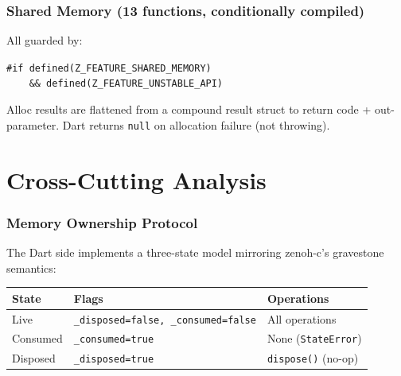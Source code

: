 \documentclass[11pt,a4paper]{article}
\newcommand{\code}[1]{\texttt{#1}}
\begin{document}
\section{Shared Memory (13 functions, conditionally compiled)}

All guarded by:

\smallskip
\code{\#if defined(Z\_FEATURE\_SHARED\_MEMORY)}\\
\code{\ \ \ \ \&\& defined(Z\_FEATURE\_UNSTABLE\_API)}
\smallskip

\noindent
Alloc results are flattened from a compound result struct to return code +
out-parameter. Dart returns \code{null} on allocation failure (not throwing).


\clearpage
\part{Cross-Cutting Analysis}
\label{part:cross-cutting}

\section{Memory Ownership Protocol}

The Dart side implements a three-state model mirroring zenoh-c's gravestone
semantics:

\begin{table}[ht]
\centering
\begin{tabular}{lll}
  \toprule
  \textbf{State} & \textbf{Flags} & \textbf{Operations} \\
  \midrule
  Live      & \code{\_disposed=false, \_consumed=false} & All operations \\
  Consumed  & \code{\_consumed=true}                     & None (\code{StateError}) \\
  Disposed  & \code{\_disposed=true}                     & \code{dispose()} (no-op) \\
  \bottomrule
\end{tabular}
\end{table}
\end{document}
